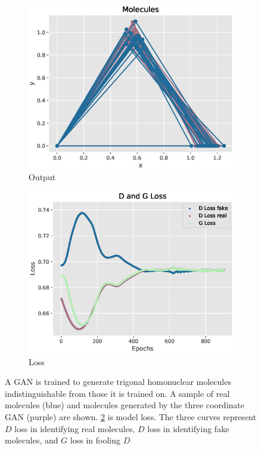 \documentclass[12pt,a4paper]{article}
\begin{document}
\begin{figure}[!h]
\centering
\begin{subfigure}[t]{0.49\textwidth}
    \includegraphics[width = \linewidth]{images/gan3.eps}
    \caption{Output}
    \label{fig:gan3mols}
\end{subfigure}
\begin{subfigure}[t]{0.49\textwidth}
    \includegraphics[width = \linewidth]{images/gan3loss.eps}
    \caption{Loss}
    \label{fig:gan3loss}
\end{subfigure}
\caption{A GAN is trained to generate trigonal homonuclear molecules indistinguishable from those it is trained on. A sample of real molecules (\textcolor{blu2}{blue}) and molecules generated by the three coordinate GAN (\textcolor{plumb}{purple}) are shown. \ref{fig:gan3loss} is model loss. The three curves represent $D$ loss in identifying real molecules, $D$ loss in identifying fake molecules, and $G$ loss in fooling $D$}
\label{fig:gan3}
\end{figure}
\end{document}

